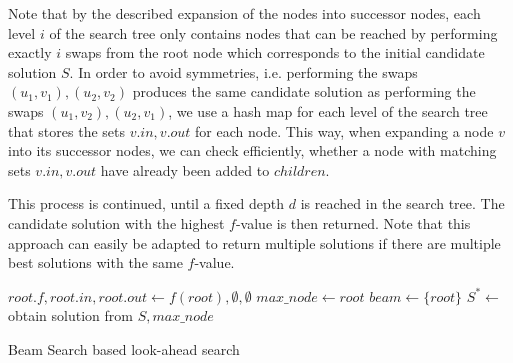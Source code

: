 \documentclass[draft,final]{vutinfth} %
\begin{document}
Note that by the described expansion of the nodes into successor nodes, each level $i$ of the search tree only contains nodes that can be reached by performing exactly $i$ swaps from the root node which corresponds to the initial candidate solution $S$. 
In order to avoid symmetries, i.e. performing the swaps $(u_1, v_1), (u_2, v_2)$ produces the same candidate solution as performing the swaps $(u_1, v_2), (u_2, v_1)$, we use a hash map for each level of the search tree that stores the sets $v.\mathit{in}, v.\mathit{out}$ for each node. This way, when expanding a node $v$ into its successor nodes, we can check efficiently, whether a node with matching sets $v.\mathit{in}, v.\mathit{out}$ have already been added to $\mathit{children}$.  

This process is continued, until a fixed depth $d$ is reached in the search tree. The candidate solution with the highest $f$-value is then returned. Note that this approach can easily be adapted to return multiple solutions if there are multiple best solutions with the same $f$-value. 


\begin{algorithm}
    \DontPrintSemicolon
    $\mathit{root}.f, \mathit{root}.\mathit{in}, \mathit{root}.\mathit{out} \gets f(\mathit{root}), \emptyset, \emptyset$ \;
    $\mathit{max\_node} \gets \mathit{root}$ \;
    $\mathit{beam} \gets \{\mathit{root}\}$ \;
    $S^* \gets$ obtain solution from $S, \mathit{max\_node}$ \;
    \caption{Beam Search based look-ahead search}
    \label{alg:lookahead-beam-search}
\end{algorithm}
\end{document}
